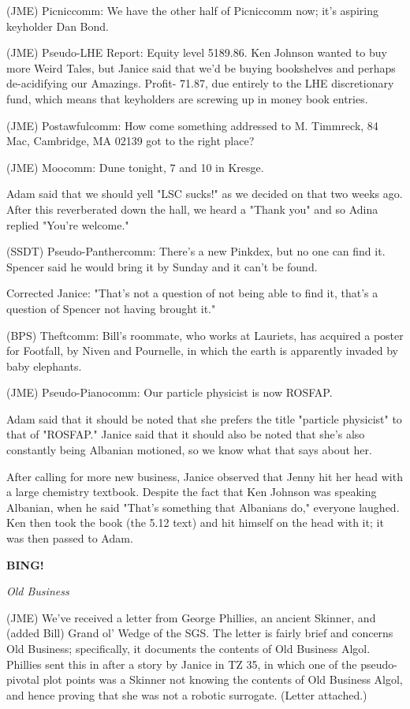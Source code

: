 \documentclass[12pt]{article}
\newcommand{\bing}{{\bf BING!} }
\newcommand{\goto}[1]{\bing \vskip 12pt \centerline{{\em{#1}}}}
\begin{document}
(JME) Picniccomm: We have the other half of Picniccomm now; it's aspiring keyholder Dan Bond.

(JME) Pseudo-LHE Report: Equity level 5189.86. Ken Johnson wanted to buy more Weird Tales, but Janice said that we'd be buying bookshelves and perhaps de-acidifying our Amazings. Profit- 71.87, due entirely to the LHE discretionary fund, which means that keyholders are screwing up in money book entries.

(JME) Postawfulcomm: How come something addressed to M. Timmreck, 84 Mac, Cambridge, MA 02139 got to the right place?

(JME) Moocomm: Dune tonight, 7 and 10 in Kresge.

Adam said that we should yell "LSC sucks!" as we decided on that two weeks ago. After this reverberated down the hall, we heard a "Thank you" and so Adina replied "You're welcome."

(SSDT) Pseudo-Panthercomm: There's a new Pinkdex, but no one can find it. Spencer said he would bring it by Sunday and it can't be found.

Corrected Janice: "That's not a question of not being able to find it, that's a question of Spencer not having brought it."

(BPS) Theftcomm: Bill's roommate, who works at Lauriets, has acquired a poster for Footfall, by Niven and Pournelle, in which the earth is apparently invaded by baby elephants.

(JME) Pseudo-Pianocomm: Our particle physicist is now ROSFAP.

Adam said that it should be noted that she prefers the title "particle physicist" to that of "ROSFAP." Janice said that it should also be noted that she's also constantly being Albanian motioned, so we know what that says about her.

After calling for more new business, Janice observed that Jenny hit her head with a large chemistry textbook. Despite the fact that Ken Johnson was speaking Albanian, when he said "That's something that Albanians do," everyone laughed. Ken then took the book (the 5.12 text) and hit himself on the head with it; it was then passed to Adam.

\goto{Old Business}

(JME) We've received a letter from George Phillies, an ancient Skinner, and (added Bill) Grand ol' Wedge of the SGS. The letter is fairly brief and concerns Old Business; specifically, it documents the contents of Old Business Algol. Phillies sent this in after a story by Janice in TZ 35, in which one of the pseudo-pivotal plot points was a Skinner not knowing the contents of Old Business Algol, and hence proving that she was not a robotic surrogate. (Letter attached.)
\end{document}
